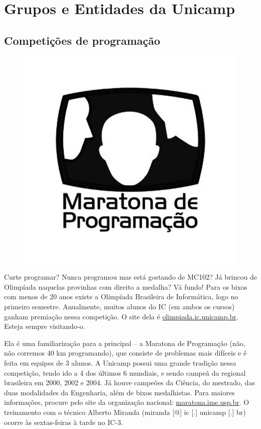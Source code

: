 
\section{Grupos e Entidades da Unicamp}

\subsection{Competições de programação}

\begin{figure}[h!]
    \vspace{-20pt}
    \centering
    \includegraphics[scale=0.30, keepaspectratio=true]{img/imgs/18-grupos_entidades/maratona.jpg}
    \vspace{-20pt}
\end{figure}
Curte programar? Nunca programou mas está gostando de MC102? Já brincou de
Olimpíada naquelas provinhas com direito a medalha? Vá fundo! Para os bixos
com menos de 20 anos existe a Olimpíada Brasileira de Informática, logo no primeiro
semestre. Anualmente, muitos alunos do IC (em ambos os cursos) ganham premiação
nessa competição. O site dela é \url{olimpiada.ic.unicamp.br}. Esteja
sempre visitando-o.

Ela é uma familiarização para a principal -- a Maratona de Programação (não, não
corremos 40 km programando), que consiste de problemas mais difíceis e é feita
em equipes de 3 alunos. A Unicamp possui uma grande tradição nessa competição,
tendo ido a 4 dos últimos 6 mundiais, e sendo campeã da regional brasileira em
2000, 2002 e 2004. Já houve campeões da Ciência, do mestrado, das duas
modalidades da Engenharia, além de bixos medalhistas. Para maiores informações,
procure pelo site da organização nacional: \url{maratona.ime.usp.br}.
O treinamento com o técnico Alberto Miranda (miranda [@] ic [.] unicamp [.] br)
ocorre às sextas-feiras à tarde no IC-3.

